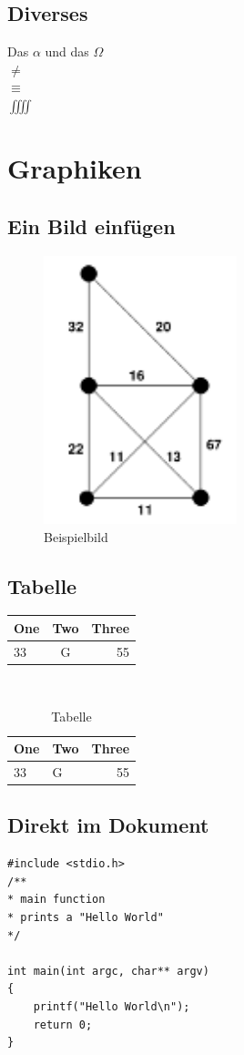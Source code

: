 \documentclass[a4paper, 10pt, fleqn]{article}
\begin{document}
\subsection{Diverses}
Das $\alpha$ und das $\Omega$\\
$\neq$\\
$\equiv$\\
$\iiiint$

\section{Graphiken}
\subsection{Ein Bild einfügen}
\begin{figure}[h!]%
\centering
\includegraphics[width=0.5\textwidth]{Graph_1.png}
\caption{Beispielbild}
\label{fig:example}
\end{figure}
\subsection{Tabelle}
\begin{tabular}{l|c|r}
One & Two & Three\\\hline
33 & G & 55\\
\end{tabular}\\
\begin{table}
\begin{tabular}{l|p{6cm}|r}
One & Two & Three\\\hline
33 & G & 55\\
\end{tabular}
\caption{Tabelle}
\label{tab:table1}
\end{table}
\label{Sourcecode}
\subsection{Direkt im Dokument}
\begin{lstlisting}
#include <stdio.h>
/**
* main function
* prints a "Hello World"
*/

int main(int argc, char** argv)
{
	printf("Hello World\n");
	return 0;
}
\end{lstlisting}	
\end{document}
